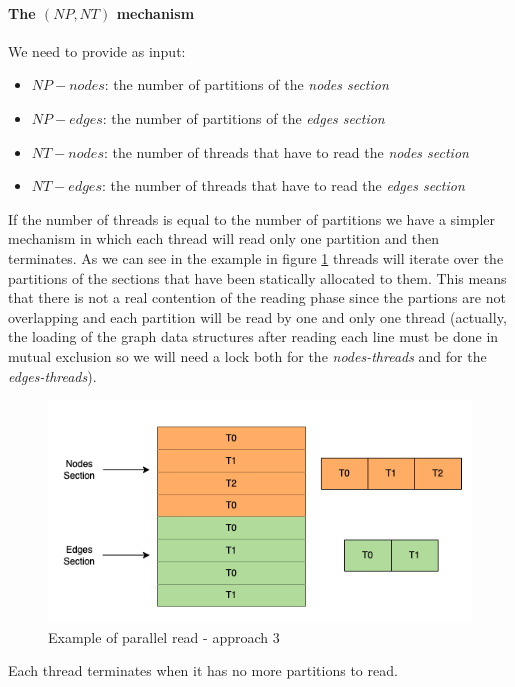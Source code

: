 \documentclass[twocolumn, switch]{article} %
\begin{document}
\paragraph{The $(NP, NT)$ mechanism}
We need to provide as input:
\begin{itemize}
  \item $NP-nodes$: the number of partitions of the \textit{nodes section}
  \item $NP-edges$: the number of partitions of the \textit{edges section}
  \item $NT-nodes$: the number of threads that have to read the \textit{nodes section}
  \item $NT-edges$: the number of threads that have to read the \textit{edges section}
\end{itemize}
If the number of threads is equal to the number of partitions we have a simpler mechanism in
which each thread will read only one partition and then terminates.
As we can see in the example in figure \ref{parread3} threads will iterate over the partitions
of the sections that have been statically allocated to them. This means that there is not a real
contention of the reading phase since the partions are not overlapping and
each partition will be read by one and only one thread (actually, the
loading of the graph data structures after reading each line must be done in mutual exclusion so we will need a lock
both for the \textit{nodes-threads} and for the \textit{edges-threads}).
\begin{figure}[ht!]
  \centering
  \includegraphics[width=1\linewidth]{par_read_3.png}
  \caption{Example of parallel read - approach 3}
  \label{parread3}
\end{figure}
Each thread terminates when it has no more partitions to read.\\
\end{document}
